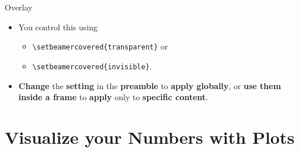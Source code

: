 \documentclass[aspectratio=169]{beamer}
\begin{document}
\begin{frame}{Overlay}
\begin{minipage}[t]{0.49\textwidth}
\begin{coloredblock}
\begin{itemize}
                \item \footnotesize You control this using 
                \begin{itemize}
                    \item \texttt{\textbackslash setbeamercovered\{transparent\}} or
                    \item \texttt{\textbackslash setbeamercovered\{invisible\}}.
                \end{itemize}
                \item \footnotesize \textbf{Change} the \textbf{setting} in the \textbf{preamble} to \textbf{apply globally}, or \textbf{use them inside a frame} to \textbf{apply} only to \textbf{specific content}.
            \end{itemize}
        \end{coloredblock}
    \end{minipage}

\end{frame}


\section{Visualize your Numbers with \textbf{Plots}}

\begin{frame}
\end{frame}
\end{document}
